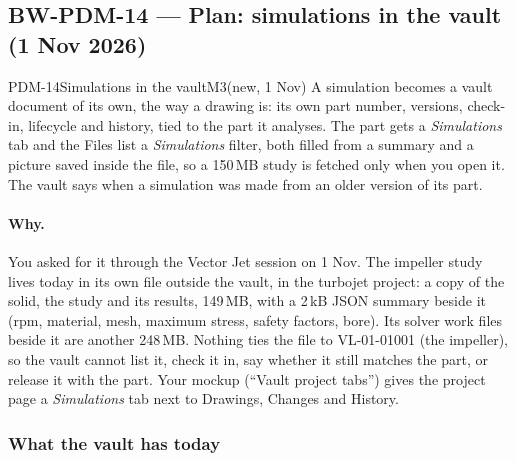 \subsection{BW-PDM-14 --- Plan: simulations in the vault (1 Nov 2026)}\label{sec:pdm14-plan}

\begin{epic}{PDM-14}{Simulations in the vault}{M3}{\stTodo}{(new, 1 Nov)}
A simulation becomes a vault document of its own, the way a drawing is: its own part number, versions, check-in,
lifecycle and history, tied to the part it analyses. The part gets a \emph{Simulations} tab and the Files list a
\emph{Simulations} filter, both filled from a summary and a picture saved inside the file, so a 150\,MB study is
fetched only when you open it. The vault says when a simulation was made from an older version of its part.
\end{epic}

\paragraph{Why.} You asked for it through the Vector Jet session on 1 Nov. The impeller study lives today in its own
file outside the vault,  in the turbojet project: a copy of the solid, the study
and its results, 149\,MB, with a 2\,kB JSON summary beside it (rpm, material, mesh, maximum stress, safety factors,
bore). Its solver work files beside it are another 248\,MB. Nothing ties the file to VL-01-01001 (the impeller), so the
vault cannot list it, check it in, say whether it still matches the part, or release it with the part. Your mockup
(``Vault project tabs'') gives the project page a \emph{Simulations} tab next to Drawings, Changes and History.

\subsubsection*{What the vault has today}

